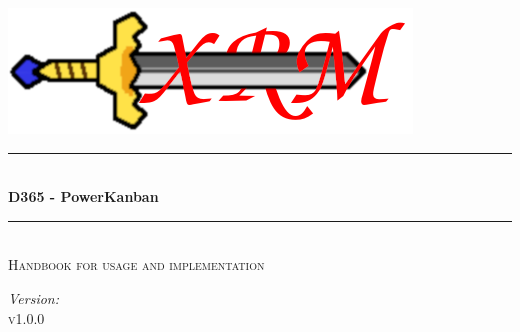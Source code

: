 \begin{titlepage}
\begin{center}
\includegraphics[width=\textwidth]{logo.png}\\[1cm]    

\newcommand{\HRule}{\rule{\linewidth}{0.5mm}}
\HRule \\[0.4cm]
{ \huge \bfseries D365 - PowerKanban}\\[0.4cm]
\HRule \\[1.5cm]
\textsc{\Large Handbook for usage and implementation}\\[0.5cm]

\vfill
\begin{minipage}{1.0\textwidth}
\begin{flushright}
\large
\emph{Version:}\\
\textsc{v1.0.0}
\end{flushright}
\end{minipage}
\end{center}
\end{titlepage}
